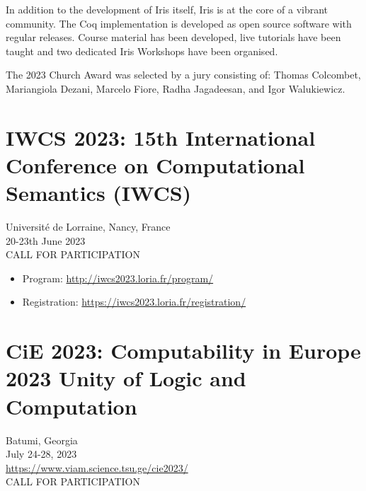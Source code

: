 \documentclass[prodmode,acmtecs]{acmsmall} %
\begin{document}
\begin{itemize}
  In addition to the development of Iris itself, Iris is at the core of a vibrant community. The Coq implementation is developed as open source software with regular releases. Course material has been developed, live tutorials have been taught and two dedicated Iris Workshops have been organised. 
 
  The 2023 Church Award was selected by a jury consisting of: Thomas Colcombet, Mariangiola Dezani, Marcelo Fiore, Radha Jagadeesan, and Igor Walukiewicz. 
 
\end{itemize}\section{IWCS 2023: 15th International Conference on Computational Semantics (IWCS)}\label{IWCS2023}  Université de Lorraine, Nancy, France\\ 
  20-23th June 2023\\ 
CALL FOR PARTICIPATION 

\begin{itemize}\item  Program: \href{http://iwcs2023.loria.fr/program/}{http://iwcs2023.loria.fr/program/} 
 
\item  Registration:  \href{https://iwcs2023.loria.fr/registration/}{https://iwcs2023.loria.fr/registration/} 
 
\end{itemize}\section{CiE 2023: Computability in Europe 2023 Unity of Logic and Computation}\label{CiE2023}  Batumi, Georgia\\ 
  July 24-28, 2023\\ 
  \href{https://www.viam.science.tsu.ge/cie2023/}{https://www.viam.science.tsu.ge/cie2023/}\\ 
CALL FOR PARTICIPATION 
\end{document}
